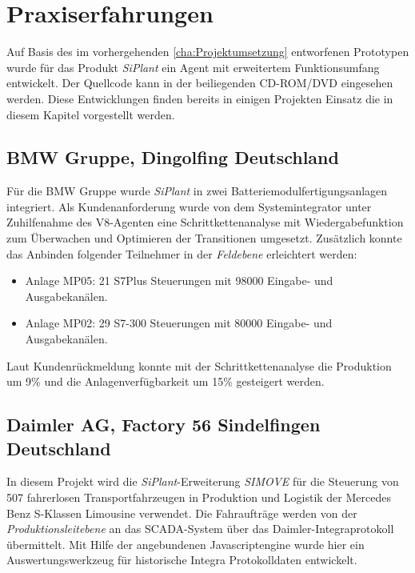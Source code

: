 \chapter{Praxiserfahrungen}
\label{cha:praxis}

Auf Basis des im vorhergehenden \autoref{cha:Projektumsetzung} entworfenen Prototypen wurde für das Produkt \textit{SiPlant} 
ein Agent mit erweitertem Funktionsumfang entwickelt. Der Quellcode kann in der beiliegenden CD-ROM/DVD eingesehen werden. 
Diese Entwicklungen finden bereits in einigen Projekten Einsatz die in diesem Kapitel vorgestellt werden.

\section{BMW Gruppe, Dingolfing Deutschland}

Für die BMW Gruppe wurde \textit{SiPlant} in zwei Batteriemodulfertigungsanlagen integriert. Als Kundenanforderung wurde von dem 
Systemintegrator unter Zuhilfenahme des V8-Agenten eine Schrittkettenanalyse mit Wiedergabefunktion zum Überwachen und Optimieren
der Transitionen umgesetzt. Zusätzlich konnte das Anbinden folgender Teilnehmer in der \textit{Feldebene} erleichtert werden:

\begin{itemize}
    \item Anlage MP05: 21 S7Plus Steuerungen mit 98000 Eingabe- und Ausgabekanälen.
    \item Anlage MP02: 29 S7-300 Steuerungen mit 80000 Eingabe- und Ausgabekanälen.
\end{itemize}

Laut Kundenrückmeldung konnte mit der Schrittkettenanalyse die Produktion um 9\% und die  
Anlagenverfügbarkeit um 15\% gesteigert werden.

\section{Daimler AG, Factory 56 Sindelfingen Deutschland}

In diesem Projekt wird die \textit{SiPlant}-Erweiterung \textit{SIMOVE} für die Steuerung von 507 fahrerlosen Transportfahrzeugen in Produktion
und Logistik der Mercedes Benz S-Klassen Limousine verwendet. Die Fahraufträge werden von der \textit{Produktionsleitebene} an das SCADA-System 
über das Daimler-Integraprotokoll übermittelt. Mit Hilfe der angebundenen Javascriptengine wurde hier ein Auswertungswerkzeug für historische 
Integra Protokolldaten entwickelt.  

